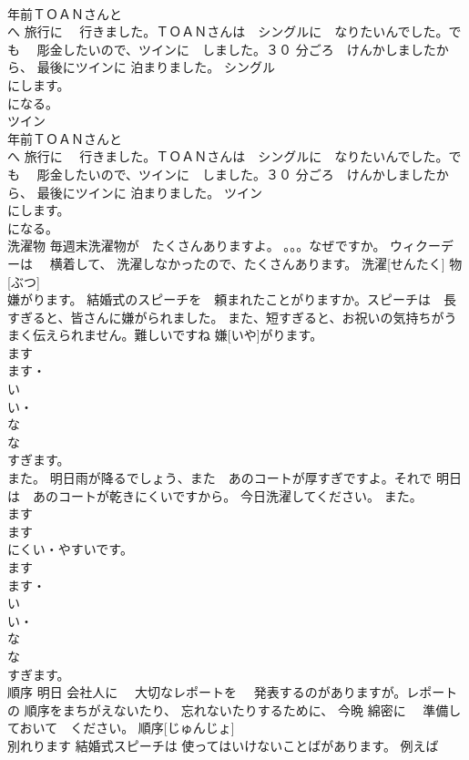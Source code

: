 \documentclass[8pt]{extreport}
\begin{document}
\begin{CJK}{UTF8}{min}
\\	年前ＴＯＡＮさんと　
\\	へ 旅行に　 行きました。ＴＯＡＮさんは　シングルに　なりたいんでした。でも　 彫金したいので、ツインに　しました。３０ 分ごろ　けんかしましたから、 最後にツインに 泊まりました。	シングル				
\\	にします。
\\	になる。
\\	ツイン	
\\	年前ＴＯＡＮさんと　
\\	へ 旅行に　 行きました。ＴＯＡＮさんは　シングルに　なりたいんでした。でも　 彫金したいので、ツインに　しました。３０ 分ごろ　けんかしましたから、 最後にツインに 泊まりました。	ツイン				
\\	にします。
\\	になる。
\\	洗濯物	毎週末洗濯物が　たくさんありますよ。 。。。なぜですか。 ウィクーデーは　 横着して、 洗濯しなかったので、たくさんあります。	洗濯[せんたく] 物[ぶつ]					
\\	嫌がります。	結婚式のスピーチを　頼まれたことがりますか。スピーチは　長すぎると、皆さんに嫌がられました。 また、短すぎると、お祝いの気持ちがうまく伝えられません。難しいですね	嫌[いや]がります。				
\\	ます　
\\	ます・
\\	い
\\	い・
\\	な
\\	な
\\	すぎます。
\\	また。	明日雨が降るでしょう、また　あのコートが厚すぎですよ。それで 明日は　あのコートが乾きにくいですから。 今日洗濯してください。	また。			
\\	ます　
\\	ます
\\	にくい・やすいです。
\\	ます　
\\	ます・
\\	い
\\	い・
\\	な
\\	な
\\	すぎます。
\\	順序	明日 会社人に　 大切なレポートを　 発表するのがありますが。レポートの 順序をまちがえないたり、 忘れないたりするために、 今晩 綿密に　 準備しておいて　ください。	順序[じゅんじょ]					
\\	別れります	結婚式スピーチは 使ってはいけないことばがあります。 例えば　

\end{CJK}
\end{document}
